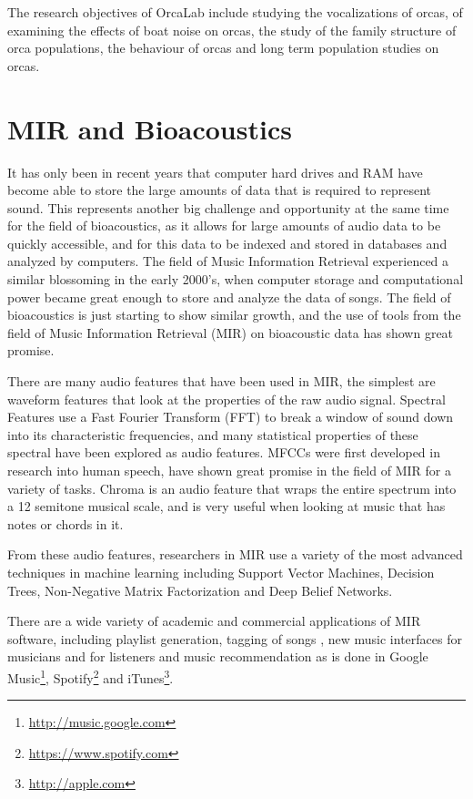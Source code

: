 The research objectives of OrcaLab include studying the vocalizations
of orcas, of examining the effects of boat noise on orcas, the study
of the family structure of orca populations, the behaviour of orcas
and long term population studies on orcas.  


%
%
\section{MIR and Bioacoustics}
\label{section:introduction:MIRandBioacoustics}

It has only been in recent years that computer hard drives and RAM
have become able to store the large amounts of data that is required
to represent sound.  This represents another big challenge and
opportunity at the same time for the field of bioacoustics, as it
allows for large amounts of audio data to be quickly accessible, and
for this data to be indexed and stored in databases and analyzed by
computers.  The field of Music Information Retrieval experienced a
similar blossoming in the early 2000's, when computer storage and
computational power became great enough to store and analyze the data
of songs.  The field of bioacoustics is just starting to show similar
growth, and the use of tools from the field of Music Information
Retrieval (MIR) on bioacoustic data has shown great promise.

There are many audio features that have been used in MIR, the simplest
are waveform features that look at the properties of the raw audio
signal.  Spectral Features use a Fast Fourier Transform (FFT) to break
a window of sound down into its characteristic frequencies, and many
statistical properties of these spectral have been explored as audio
features.  MFCCs were first developed in research into human speech,
have shown great promise in the field of MIR for a variety of tasks.
Chroma is an audio feature that wraps the entire spectrum into a 12
semitone musical scale, and is very useful when looking at music that
has notes or chords in it.

From these audio features, researchers in MIR use a variety of the
most advanced techniques in machine learning including Support Vector
Machines, Decision Trees, Non-Negative Matrix Factorization and Deep
Belief Networks.

There are a wide variety of academic and commercial applications of
MIR software, including playlist generation, tagging of songs
\cite{ness2009improving}, new music interfaces for musicians
\cite{ness2011gesture} and for listeners \cite{ness2009audioscapes}
and music recommendation \cite{miller2010geoshuffle} as is done in
Google Music\footnote{\url{http://music.google.com}},
Spotify\footnote{\url{https://www.spotify.com}} and
iTunes\footnote{\url{http://apple.com}}.

